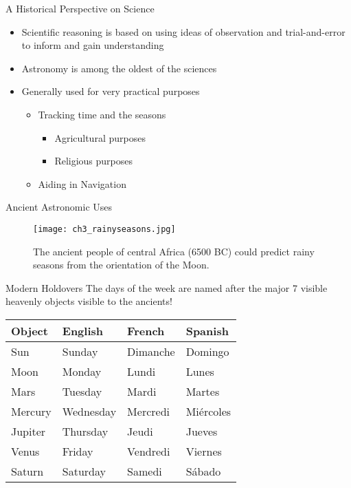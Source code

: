 \documentclass[pdf, aspectratio=169]{beamer}
\begin{document}
\begin{frame}{A Historical Perspective on Science}
  \begin{itemize}
	\item Scientific reasoning is based on using ideas of observation and trial-and-error to inform and gain understanding
	\item Astronomy is among the oldest of the sciences
	\item Generally used for very practical purposes
	  \begin{itemize}
		\item Tracking time and the seasons
		  \begin{itemize}
			\item Agricultural purposes
			\item Religious purposes
		  \end{itemize}
		\item Aiding in Navigation
	  \end{itemize}
  \end{itemize}
\end{frame}

\begin{frame}{Ancient Astronomic Uses}
  \begin{figure}[h!]
	\centering
	\texttt{[image: ch3\_rainyseasons.jpg]}
	\caption*{The ancient people of central Africa (6500 BC) could predict rainy seasons from the orientation of the Moon.}
  \end{figure}
\end{frame}

\begin{frame}{Modern Holdovers}
  The days of the week are named after the major 7 visible heavenly objects visible to the ancients!
  \begin{table}[h!]
	\centering
	\begin{tabular}{llll}
	  \toprule
	  Object & English & French & Spanish \\
	  \midrule
	  Sun & Sunday & Dimanche & Domingo \\
	  Moon & Monday & Lundi & Lunes \\
	  Mars & Tuesday & Mardi & Martes \\
	  Mercury & Wednesday & Mercredi & Mi\'{e}rcoles \\
	  Jupiter & Thursday & Jeudi & Jueves \\
	  Venus & Friday & Vendredi & Viernes \\
	  Saturn & Saturday & Samedi & S\'{a}bado \\
	  \bottomrule
	\end{tabular}
  \end{table}
\end{frame}
\end{document}
